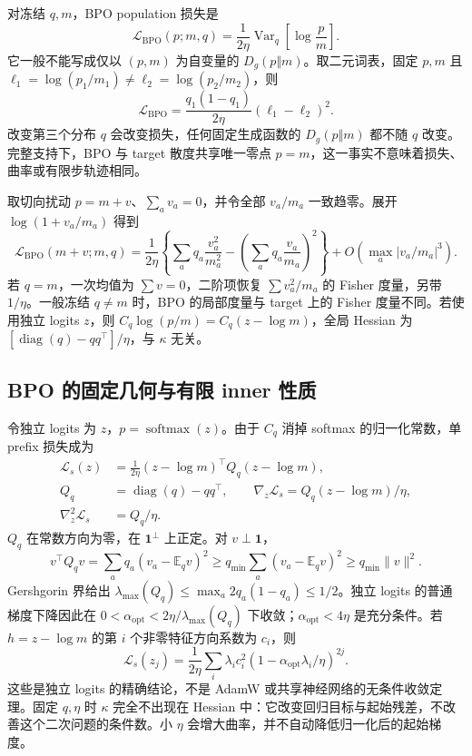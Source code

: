 \documentclass[lang=cn,scheme=chinese,openany]{../book/elegantbook}
\newcommand{\E}{\mathbb E}
\newcommand{\Var}{\operatorname{Var}}
\begin{document}
对冻结 $q,m$，BPO population 损失是
\begin{equation}
 \mathcal L_{\mathrm{BPO}}(p;m,q)
 =\frac1{2\eta}\Var_q\!\left[\log\frac p m\right].
 \label{eq:divergence-map-bpo-loss}
\end{equation}
它一般不能写成仅以 $(p,m)$ 为自变量的 $D_g(p\Vert m)$。取二元词表，固定 $p,m$ 且 $\ell_1=\log(p_1/m_1)\ne\ell_2=\log(p_2/m_2)$，则
\begin{equation}
 \mathcal L_{\mathrm{BPO}}=\frac{q_1(1-q_1)}{2\eta}(\ell_1-\ell_2)^2.
\end{equation}
改变第三个分布 $q$ 会改变损失，任何固定生成函数的 $D_g(p\Vert m)$ 都不随 $q$ 改变。完整支持下，BPO 与 target 散度共享唯一零点 $p=m$，这一事实不意味着损失、曲率或有限步轨迹相同。

取切向扰动 $p=m+v$、$\sum_av_a=0$，并令全部 $v_a/m_a$ 一致趋零。展开 $\log(1+v_a/m_a)$ 得到
\begin{equation}
 \mathcal L_{\mathrm{BPO}}(m+v;m,q)
 =\frac1{2\eta}\left\{\sum_aq_a\frac{v_a^2}{m_a^2}
 -\left(\sum_aq_a\frac{v_a}{m_a}\right)^2\right\}
 +O\!\left(\max_a|v_a/m_a|^3\right).
\end{equation}
若 $q=m$，一次均值为 $\sum v=0$，二阶项恢复 $\sum v_a^2/m_a$ 的 Fisher 度量，另带 $1/\eta$。一般冻结 $q\ne m$ 时，BPO 的局部度量与 target 上的 Fisher 度量不同。若使用独立 logits $z$，则 $C_q\log(p/m)=C_q(z-\log m)$，全局 Hessian 为 $[\operatorname{diag}(q)-qq^\top]/\eta$，与 $\kappa$ 无关。

\subsection{BPO 的固定几何与有限 inner 性质}

令独立 logits 为 $z$，$p=\operatorname{softmax}(z)$。由于 $C_q$ 消掉 softmax 的归一化常数，单 prefix 损失成为
\begin{align}
 \mathcal L_s(z)&=\frac1{2\eta}
    (z-\log m)^\top Q_q(z-\log m),\\
 Q_q&=\operatorname{diag}(q)-qq^\top,\qquad
 \nabla_z\mathcal L_s=Q_q(z-\log m)/\eta,\\
 \nabla_z^2\mathcal L_s&=Q_q/\eta.
\end{align}
$Q_q$ 在常数方向为零，在 $\boldsymbol1^\perp$ 上正定。对 $v\perp\boldsymbol1$，
\begin{equation}
 v^\top Q_qv=\sum_aq_a(v_a-\E_qv)^2
 \ge q_{\min}\sum_a(v_a-\E_qv)^2
 \ge q_{\min}\|v\|^2.
\end{equation}
Gershgorin 界给出 $\lambda_{\max}(Q_q)\le\max_a2q_a(1-q_a)\le1/2$。独立 logits 的普通梯度下降因此在 $0<\alpha_{\mathrm{opt}}<2\eta/\lambda_{\max}(Q_q)$ 下收敛；$\alpha_{\mathrm{opt}}<4\eta$ 是充分条件。若 $h=z-\log m$ 的第 $i$ 个非零特征方向系数为 $c_i$，则
\begin{equation}
 \mathcal L_s(z_j)=\frac1{2\eta}\sum_i\lambda_i c_i^2
    (1-\alpha_{\mathrm{opt}}\lambda_i/\eta)^{2j}.
\end{equation}
这些是独立 logits 的精确结论，不是 AdamW 或共享神经网络的无条件收敛定理。固定 $q,\eta$ 时 $\kappa$ 完全不出现在 Hessian 中：它改变回归目标与起始残差，不改善这个二次问题的条件数。小 $\eta$ 会增大曲率，并不自动降低归一化后的起始梯度。
\end{document}
